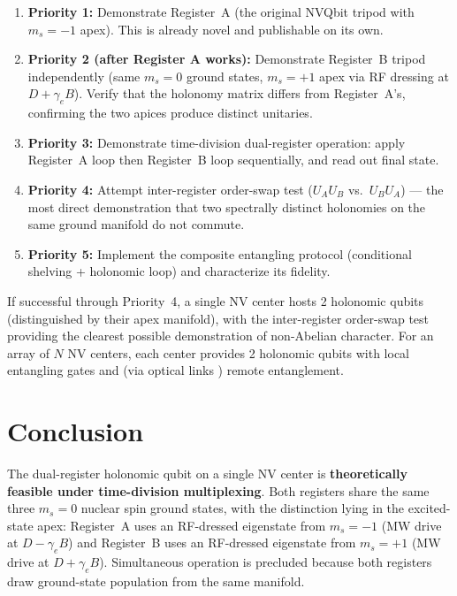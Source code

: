 \documentclass[11pt,letterpaper]{article}
\begin{document}
\begin{enumerate}[leftmargin=*]
    \item \textbf{Priority 1:} Demonstrate Register~A (the original NVQbit tripod with $m_s = -1$ apex). This is already novel and publishable on its own.
    \item \textbf{Priority 2 (after Register A works):} Demonstrate Register~B tripod independently (same $m_s = 0$ ground states, $m_s = +1$ apex via RF dressing at $D + \gamma_e B$). Verify that the holonomy matrix differs from Register~A's, confirming the two apices produce distinct unitaries.
    \item \textbf{Priority 3:} Demonstrate time-division dual-register operation: apply Register~A loop then Register~B loop sequentially, and read out final state.
    \item \textbf{Priority 4:} Attempt inter-register order-swap test ($U_A U_B$ vs.\ $U_B U_A$) --- the most direct demonstration that two spectrally distinct holonomies on the same ground manifold do not commute.
    \item \textbf{Priority 5:} Implement the composite entangling protocol (conditional shelving + holonomic loop) and characterize its fidelity.
\end{enumerate}

\noindent If successful through Priority~4, a single NV center hosts 2 holonomic qubits (distinguished by their apex manifold), with the inter-register order-swap test providing the clearest possible demonstration of non-Abelian character. For an array of $N$ NV centers, each center provides 2 holonomic qubits with local entangling gates and (via optical links \cite{Pompili2021}) remote entanglement.

\section{Conclusion}

The dual-register holonomic qubit on a single NV center is \textbf{theoretically feasible under time-division multiplexing}. Both registers share the same three $m_s = 0$ nuclear spin ground states, with the distinction lying in the excited-state apex: Register~A uses an RF-dressed eigenstate from $m_s = -1$ (MW drive at $D - \gamma_e B$) and Register~B uses an RF-dressed eigenstate from $m_s = +1$ (MW drive at $D + \gamma_e B$). Simultaneous operation is precluded because both registers draw ground-state population from the same manifold.
\end{document}
